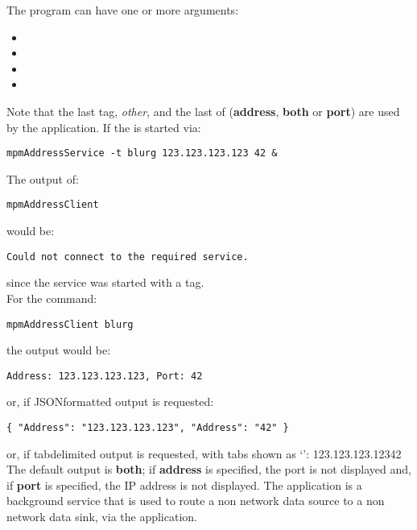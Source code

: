 The program can have one or more arguments:
\begin{itemize}
\item{}
\item\exSp{}
\item\exSp{}
\item\exSp{}
\end{itemize}
Note that the last tag, \emph{other}, and the last of (\textbf{address}, \textbf{both} or
\textbf{port}) are used by the application.
\condPage{}
If the  is started via:
\outputBegin{}
\begin{verbatim}
mpmAddressService -t blurg 123.123.123.123 42 &
\end{verbatim}
\outputEnd{}
The output of:
\outputBegin{}
\begin{verbatim}
mpmAddressClient
\end{verbatim}
\outputEnd{}
would be:
\outputBegin{}
\begin{verbatim}
Could not connect to the required service.
\end{verbatim}
\outputEnd{}
since the service was started with a tag.\\

For the command:
\outputBegin{}
\begin{verbatim}
mpmAddressClient blurg
\end{verbatim}
\outputEnd{}
the output would be:
\outputBegin{}
\begin{verbatim}
Address: 123.123.123.123, Port: 42
\end{verbatim}
\outputEnd{}
or, if JSON\longDash{}formatted output is requested:
\outputBegin{}
\begin{verbatim}
{ "Address": "123.123.123.123", "Address": "42" }
\end{verbatim}
\outputEnd{}
or, if tab\longDash{}delimited output is requested, with tabs shown as `\tabSymbol':
\outputBegin{}
123.123.123.123\pseudotab{}42
\outputEnd{}
The default output is \textbf{both}; if \textbf{address} is specified, the port is not
displayed and, if \textbf{port} is specified, the IP address is not displayed.
The  application is a background service that is used to
route a non\longDash\yarp{} network data source to a non\longDash\yarp{} network data
sink, via the  application.\\

